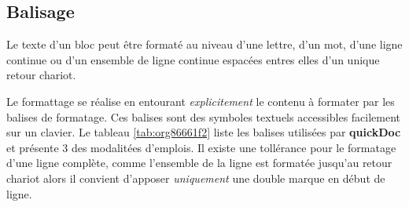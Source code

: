 \documentclass[a4paper,12pt]{article}
\begin{document}
\subsection{Balisage}
\label{sec:orgaa3c234}
Le texte d'un bloc peut être formaté au niveau d'une lettre, d'un mot, d'une ligne continue ou d'un ensemble de ligne continue espacées entres elles d'un unique retour chariot.

Le formattage se réalise en entourant \emph{explicitement} le contenu à formater par les balises de formatage. Ces balises sont des symboles textuels accessibles facilement sur un clavier. Le tableau \ref{tab:org86661f2} liste les balises utilisées par \textbf{quickDoc} et présente 3 des modalitées d'emplois. Il existe une tollérance pour le formatage d'une ligne complète, comme l'ensemble de la ligne est formatée jusqu'au retour chariot alors il convient d'apposer \emph{uniquement} une double marque en début de ligne.  
\end{document}
